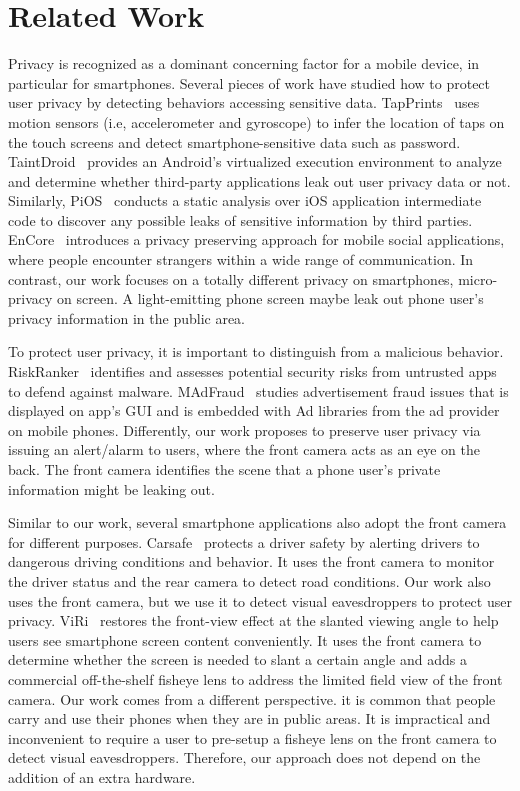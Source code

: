 \section{Related Work}


Privacy is recognized as a dominant concerning factor for a mobile device, in particular for smartphones.
Several pieces of work have studied how to protect user privacy by detecting  behaviors   accessing sensitive data.
TapPrints~\cite{tapprints2012} uses motion sensors (i.e, accelerometer and gyroscope) to infer the location of taps on the touch screens and detect smartphone-sensitive data such as password.
TaintDroid~\cite{taintdroid2014} provides an Android's virtualized execution environment to analyze and determine whether third-party applications leak out user  privacy data or not.
Similarly,  PiOS~\cite{pios2011} conducts a static analysis over iOS application intermediate code to discover any possible leaks of sensitive information by third parties. EnCore~\cite{encore2014} introduces a privacy preserving approach for mobile social applications, where people encounter strangers within a wide range of communication.
In contrast, our work focuses on a totally different privacy on smartphones, micro-privacy on screen.
A light-emitting phone screen maybe leak  out phone user's privacy information in the public area.

To protect user privacy, it is important to distinguish from a malicious behavior.
RiskRanker~\cite{riskranker2012} identifies and assesses potential security risks from  untrusted apps to defend against malware.
MAdFraud~\cite{madfraud2014} studies advertisement fraud issues that is displayed on app's GUI and is embedded with Ad libraries from  the ad provider on mobile phones.
Differently, our work proposes to preserve user privacy via issuing an alert/alarm to users, where the front camera acts as an eye on the back.
The front camera identifies the scene that a phone user's private information might be leaking out.


Similar to our work, several smartphone applications also adopt the front camera for different purposes. 
Carsafe~\cite{carsafe2013} protects a  driver safety by alerting drivers to dangerous driving conditions and behavior. It uses  the front camera to monitor the driver  status and the rear camera to detect road conditions.
Our work also uses the front camera, but we use it to detect visual eavesdroppers to protect user privacy.
ViRi~\cite{viri2013} restores the front-view effect at the  slanted viewing angle to help users  see smartphone screen content conveniently. It uses the front camera  to  determine whether the screen is needed to slant a certain angle and adds  a commercial off-the-shelf fisheye lens to address  the limited field view of the front camera.
Our work comes from a different perspective. it is common that people  carry and use their phones when they are in public areas. It is impractical and inconvenient to require a user to pre-setup a fisheye lens  on the front camera to detect visual eavesdroppers. Therefore, our approach does not depend on the addition of an extra hardware. 